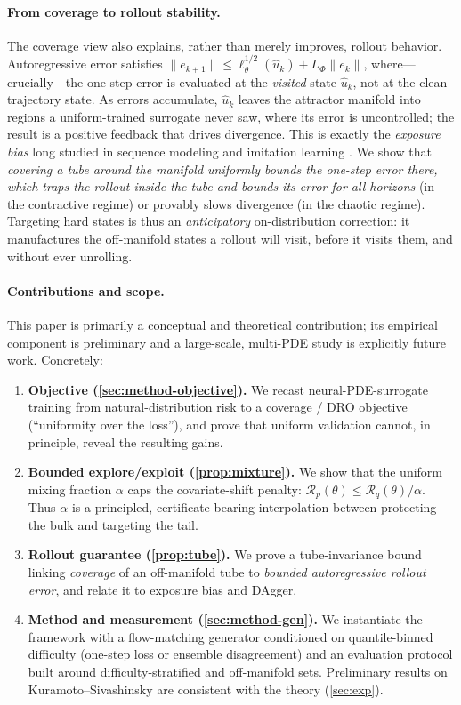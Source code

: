 \documentclass{article}
\theoremstyle{plain}
\theoremstyle{definition}
\theoremstyle{remark}
\newcommand{\state}{u}
\newcommand{\sol}{\Phi}
\newcommand{\lossf}{\ell_\theta}
\newcommand{\pnat}{p}
\newcommand{\qtr}{q}
\newcommand{\Rp}{\mathcal{R}_{\pnat}}
\newcommand{\Rq}{\mathcal{R}_{\qtr}}
\newcommand{\unif}{\alpha}
\begin{document}
\paragraph{From coverage to rollout stability.}
The coverage view also explains, rather than merely improves, rollout behavior. Autoregressive error
satisfies $\|e_{k+1}\|\le \lossf^{1/2}(\hat\state_k) + L_{\sol}\|e_k\|$, where---crucially---the one-step
error is evaluated at the \emph{visited} state $\hat\state_k$, not at the clean trajectory state. As
errors accumulate, $\hat\state_k$ leaves the attractor manifold into regions a uniform-trained surrogate
never saw, where its error is uncontrolled; the result is a positive feedback that drives divergence.
This is exactly the \emph{exposure bias} long studied in sequence modeling and imitation learning
\citep{bengio2015scheduled,ranzato2016sequence,ross2011dagger}. We show that \emph{covering a tube around
the manifold uniformly bounds the one-step error there, which traps the rollout inside the tube and
bounds its error for all horizons} (in the contractive regime) or provably slows divergence (in the
chaotic regime). Targeting hard states is thus an \emph{anticipatory} on-distribution correction: it
manufactures the off-manifold states a rollout will visit, before it visits them, and without ever
unrolling.

\paragraph{Contributions and scope.}
This paper is primarily a conceptual and theoretical contribution; its empirical component is preliminary
and a large-scale, multi-PDE study is explicitly future work. Concretely:
\begin{enumerate}[topsep=2pt,itemsep=1pt,leftmargin=1.4em]
  \item \textbf{Objective (\cref{sec:method-objective}).} We recast neural-PDE-surrogate training from
  natural-distribution risk to a coverage / DRO objective (``uniformity over the loss''), and prove that
  uniform validation cannot, in principle, reveal the resulting gains.
  \item \textbf{Bounded explore/exploit (\cref{prop:mixture}).} We show that the uniform mixing fraction
  $\unif$ caps the covariate-shift penalty: $\Rp(\theta)\le \Rq(\theta)/\unif$. Thus $\unif$ is a
  principled, certificate-bearing interpolation between protecting the bulk and targeting the tail.
  \item \textbf{Rollout guarantee (\cref{prop:tube}).} We prove a tube-invariance bound linking
  \emph{coverage} of an off-manifold tube to \emph{bounded autoregressive rollout error}, and relate it
  to exposure bias and DAgger.
  \item \textbf{Method and measurement (\cref{sec:method-gen}).} We instantiate the framework with a
  flow-matching generator conditioned on quantile-binned difficulty (one-step loss or ensemble
  disagreement) and an evaluation protocol built around difficulty-stratified and off-manifold sets.
  Preliminary results on Kuramoto--Sivashinsky are consistent with the theory (\cref{sec:exp}).
\end{enumerate}
\end{document}
